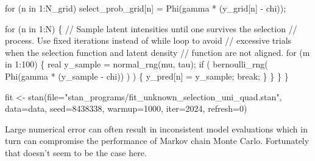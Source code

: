 \documentclass[
  letterpaper,
  DIV=11,
  numbers=noendperiod]{scrartcl}
\newenvironment{Shaded}{\begin{snugshade}}{\end{snugshade}}
\newcommand{\AttributeTok}[1]{\textcolor[rgb]{0.40,0.45,0.13}{#1}}
\newcommand{\CommentTok}[1]{\textcolor[rgb]{0.37,0.37,0.37}{#1}}
\newcommand{\ControlFlowTok}[1]{\textcolor[rgb]{0.00,0.23,0.31}{#1}}
\newcommand{\DataTypeTok}[1]{\textcolor[rgb]{0.68,0.00,0.00}{#1}}
\newcommand{\DecValTok}[1]{\textcolor[rgb]{0.68,0.00,0.00}{#1}}
\newcommand{\FunctionTok}[1]{\textcolor[rgb]{0.28,0.35,0.67}{#1}}
\newcommand{\NormalTok}[1]{\textcolor[rgb]{0.00,0.23,0.31}{#1}}
\newcommand{\OtherTok}[1]{\textcolor[rgb]{0.00,0.23,0.31}{#1}}
\newcommand{\SpecialCharTok}[1]{\textcolor[rgb]{0.37,0.37,0.37}{#1}}
\newcommand{\StringTok}[1]{\textcolor[rgb]{0.13,0.47,0.30}{#1}}
\begin{document}
\begin{codelisting}
\begin{Shaded}
\begin{Highlighting}[]
  \ControlFlowTok{for}\NormalTok{ (n }\ControlFlowTok{in} \DecValTok{1}\NormalTok{:N\_grid)}
\NormalTok{    select\_prob\_grid[n] = Phi(gamma * (y\_grid[n] {-} chi));}
  
  \ControlFlowTok{for}\NormalTok{ (n }\ControlFlowTok{in} \DecValTok{1}\NormalTok{:N) \{}
    \CommentTok{// Sample latent intensities until one survives the selection}
    \CommentTok{// process.  Use fixed iterations instead of while loop to avoid }
    \CommentTok{// excessive trials when the selection function and latent density }
    \CommentTok{// function are not aligned.}
    \ControlFlowTok{for}\NormalTok{ (m }\ControlFlowTok{in} \DecValTok{1}\NormalTok{:}\DecValTok{100}\NormalTok{) \{}
      \DataTypeTok{real}\NormalTok{ y\_sample = normal\_rng(mu, tau);}
      \ControlFlowTok{if}\NormalTok{ ( bernoulli\_rng( Phi(gamma * (y\_sample {-} chi)) ) ) \{}
\NormalTok{        y\_pred[n] = y\_sample;}
        \ControlFlowTok{break}\NormalTok{;}
\NormalTok{      \}}
\NormalTok{    \}}
\NormalTok{  \}}
\NormalTok{\}}
\end{Highlighting}
\end{Shaded}

\end{codelisting}

\begin{Shaded}
\begin{Highlighting}[]
\NormalTok{fit }\OtherTok{\textless{}{-}} \FunctionTok{stan}\NormalTok{(}\AttributeTok{file=}\StringTok{"stan\_programs/fit\_unknown\_selection\_uni\_quad.stan"}\NormalTok{,}
            \AttributeTok{data=}\NormalTok{data, }\AttributeTok{seed=}\DecValTok{8438338}\NormalTok{,}
            \AttributeTok{warmup=}\DecValTok{1000}\NormalTok{, }\AttributeTok{iter=}\DecValTok{2024}\NormalTok{, }\AttributeTok{refresh=}\DecValTok{0}\NormalTok{)}
\end{Highlighting}
\end{Shaded}

Large numerical error can often result in inconsistent model evaluations
which in turn can compromise the performance of Markov chain Monte
Carlo. Fortunately that doesn't seem to be the case here.

\begin{Shaded}
\end{Shaded}
\end{document}
